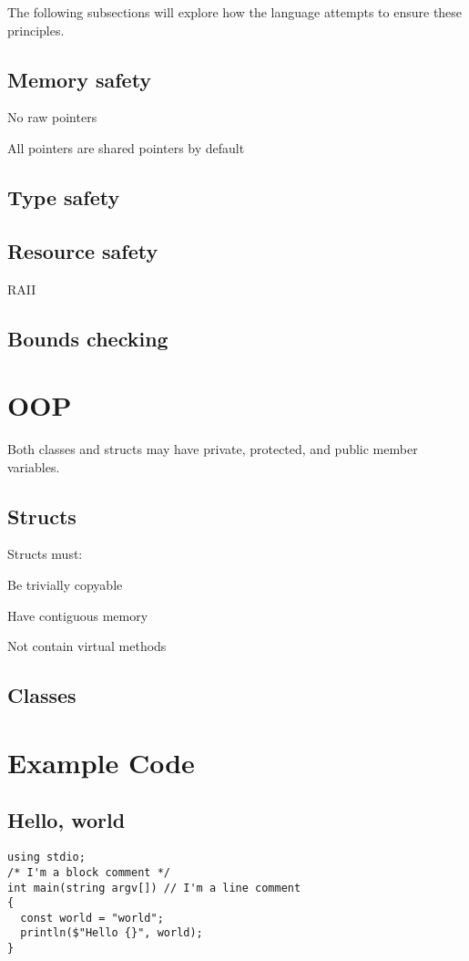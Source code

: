 \documentclass[border=1in]{standalone}
\begin{document}
\begin{minipage}{21cm}
The following subsections will explore how the language attempts to ensure these principles.

\subsection{Memory safety}
No raw pointers

All pointers are shared pointers by default


\subsection{Type safety}
\subsection{Resource safety}
RAII
\subsection{Bounds checking}

\section{OOP}

Both classes and structs may have private, protected, and public member variables.


\subsection{Structs}

Structs must:
\begin{list}{-}{}
  \item Be trivially copyable
  \item Have contiguous memory
  \item Not contain virtual methods
\end{list}

\subsection{Classes}


\section{Example Code}


\subsection*{Hello, world}
\begin{lstlisting}
using stdio;
/* I'm a block comment */
int main(string argv[]) // I'm a line comment
{
  const world = "world";
  println($"Hello {}", world);
}
\end{lstlisting}


\end{minipage}
\end{document}
